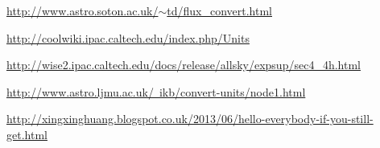 \documentclass[11pt,a4paper]{article}
\begin{document}
\noindent
[2] \href{http://www.astro.soton.ac.uk/$\sim$td/flux\_convert.html}{http://www.astro.soton.ac.uk/$\sim$td/flux\_convert.html}

\noindent
[3] \href{http://coolwiki.ipac.caltech.edu/index.php/Units}{http://coolwiki.ipac.caltech.edu/index.php/Units}

\noindent
[4] \href{http://wise2.ipac.caltech.edu/docs/release/allsky/expsup/sec4\_4h.html}{http://wise2.ipac.caltech.edu/docs/release/allsky/expsup/sec4\_4h.html}

\noindent
[5] \href{http://www.astro.ljmu.ac.uk/~ikb/convert-units/node1.html}{http://www.astro.ljmu.ac.uk/~ikb/convert-units/node1.html}

\noindent
[6] \href{http://xingxinghuang.blogspot.co.uk/2013/06/hello-everybody-if-you-still-get.html}{http://xingxinghuang.blogspot.co.uk/2013/06/hello-everybody-if-you-still-get.html}



%

\end{document}
